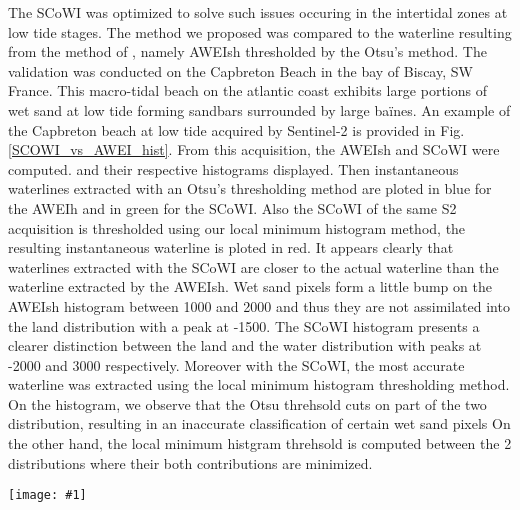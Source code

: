 \documentclass[remotesensing,article,submit,pdftex,moreauthors]{Definitions/mdpi}
\newcommand{\myfigure}[4]{
    \begin{figure*}[h!]
        \centering
        \texttt{[image: \#1]}	 
        \caption{\itshape#2}
        \label{#3}
    \end{figure*} 
}
\begin{document}
    The SCoWI was optimized to solve such issues occuring in the intertidal zones at low tide stages. 
    The method we proposed was compared to the waterline resulting from the method of \citep{Bishop_sub_pixel}, namely AWEIsh thresholded by the Otsu's method.
    The validation was conducted on the Capbreton Beach in the bay of Biscay, SW France.
    This macro-tidal beach on the atlantic coast exhibits large portions of wet sand at low tide forming sandbars surrounded by large baïnes.
    An example of the Capbreton beach at low tide acquired by Sentinel-2 is provided in Fig.\ref{SCOWI_vs_AWEI_hist}.
    From this acquisition, the AWEIsh and SCoWI were computed.
    and their respective histograms displayed.
    Then instantaneous waterlines extracted with an Otsu's thresholding method are ploted in blue for the AWEIh and in green for the SCoWI.
    Also the SCoWI of the same S2 acquisition is thresholded using our local minimum histogram method, the resulting instantaneous waterline is ploted in red.
    It appears clearly that waterlines extracted with the SCoWI are closer to the actual waterline than the waterline extracted by the AWEIsh.
    Wet sand pixels form a little bump on the AWEIsh histogram between 1000 and 2000 and thus they are not assimilated into the land distribution with a peak at -1500.
    The SCoWI histogram presents a clearer distinction between the land and the water distribution with peaks at -2000 and 3000 respectively.
    Moreover with the SCoWI, the most accurate waterline was extracted using the local minimum histogram thresholding method.
    On the histogram, we observe that the Otsu threhsold cuts on part of the two distribution, resulting in an inaccurate classification of certain wet sand pixels 
    On the other hand, the local minimum histgram threhsold is computed between the 2 distributions where their both contributions are minimized.
    
    \myfigure{img/AWEIsh_vs_SCOWI2.png}{a) Sentinel-2 acquisition of Capbreton beach at low tide. Instantaneous waterlines extracted by the 3 methods compared are displayed in plain lines. Waterline extracted by the SCoWI combined to the local minimum histogram thresholding method (red line) is the closest to the actual waterline on the acquisition. b) AWEIsh histogram of this S2 acquisition. The dashed blue line is located at the Otsu's threhsold value computed for this histogram. c) SCoWI histogram of this S2 acquisition. The dashed green line is located at the Otsu's threhsold value computed for this histogram. The dashed red line is located at the local minimum histogram threhsold value computed for this histogram.}{SCOWI_vs_AWEI_hist}{1}
\end{document}
